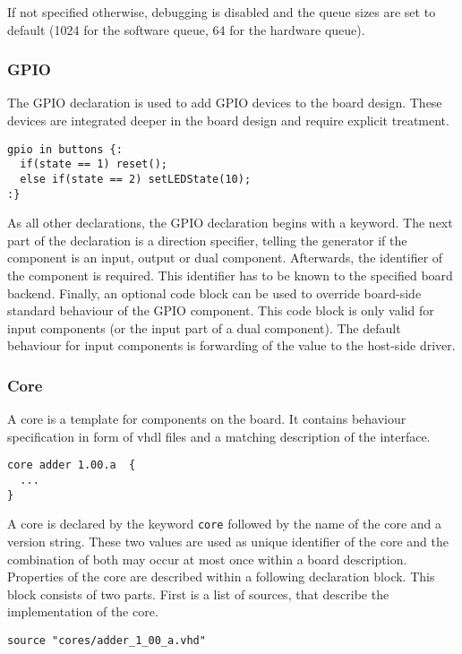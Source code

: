 \documentclass{report}
\begin{document}
If not specified otherwise, debugging is disabled and the queue sizes are set to default (1024 for the software queue, 64 for the hardware queue).

\subsubsection{GPIO}
The GPIO declaration is used to add GPIO devices to the board design. These devices are integrated deeper in the board design and require explicit treatment.

\begin{lstlisting}[language=bdl]
gpio in buttons {:
  if(state == 1) reset();
  else if(state == 2) setLEDState(10);
:}
\end{lstlisting}

As all other declarations, the GPIO declaration begins with a keyword. The next part of the declaration is a direction specifier, telling the generator if the component is an input, output or dual component.
Afterwards, the identifier of the component is required. This identifier has to be known to the specified board backend.
Finally, an optional code block can be used to override board-side standard behaviour of the GPIO component. This code block is only valid for input components (or the input part of a dual component). The default behaviour for input components is forwarding of the value to the host-side driver.

\subsubsection{Core}
A core is a template for components on the board. It contains behaviour specification in form of vhdl files and a matching description of the interface.

\begin{lstlisting}[language=bdl]
core adder 1.00.a  {
  ...
}
\end{lstlisting}

A core is declared by the keyword \texttt{core} followed by the name of the core and a version string. These two values are used as unique identifier of the core and the combination of both may occur at most once within a board description. Properties of the core are described within a following declaration block. This block consists of two parts. First is a list of sources, that describe the implementation of the core.

\begin{lstlisting}[language=bdl]
  source "cores/adder_1_00_a.vhd"
\end{lstlisting}
\end{document}
